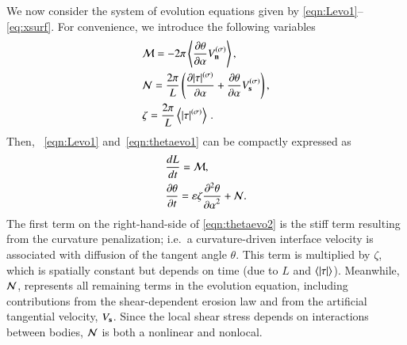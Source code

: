 \documentclass[preprint, 10pt]{elsarticle}
\begin{document}
We now consider the system of evolution equations given by \eqref{eqn:Levo1}--\eqref{eq:xsurf}. For convenience, we introduce the following variables
\begin{align}
& \mathcal{M} = - 2 \pi \left< \frac{\partial \theta}{\partial \alpha} V_{\mathbf{n}}^{(\sigma)} \right>, \\
& \mathcal{N} = \frac{2 \pi}{L} \left( \frac{\partial \lvert \tau \rvert^{(\sigma)}}{\partial \alpha} + \frac{\partial \theta}{\partial \alpha}
V_{\mathbf{s}}^{(\sigma)} \right), \\
& \zeta = \frac{2 \pi}{L}  \left< \lvert \tau \rvert^{(\sigma)} \right> \, .
\end{align}
Then, ~\eqref{eqn:Levo1} and~\eqref{eqn:thetaevo1} can be compactly expressed as
\begin{align}
\label{eqn:Levo2}
& \frac{d L}{d t} = \mathcal{M}, \\
\label{eqn:thetaevo2}
& \frac{\partial \theta}{\partial t} = \varepsilon \zeta \frac{\partial^2 \theta}{{\partial \alpha}^2} + \mathcal{N}.
\end{align}
The first term on the right-hand-side of \eqref{eqn:thetaevo2} is the stiff term resulting from the curvature penalization; i.e.~a curvature-driven interface velocity is associated with diffusion of the tangent angle $\theta$. This term is multiplied by $\zeta$, which is spatially constant but depends on time (due to $L$ and $\left< \lvert \tau \rvert \right>$). Meanwhile, $\mathcal{N}$, represents all remaining terms in the evolution equation, including contributions from the shear-dependent erosion law and from the artificial tangential velocity, $V_{\mathbf{s}}$. Since the local shear stress depends on interactions between bodies, $\mathcal{N}$ is both a nonlinear and nonlocal.
\end{document}
